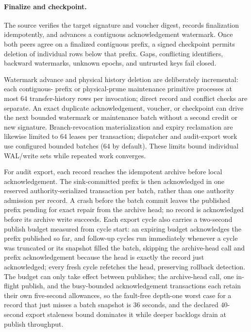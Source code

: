 \documentclass[10pt]{article}
\begin{document}
\paragraph{Finalize and checkpoint.} The source verifies the target signature and voucher digest,
records finalization idempotently, and advances a contiguous acknowledgement watermark. Once both
peers agree on a finalized contiguous prefix, a signed checkpoint permits deletion of individual
rows below that prefix. Gaps, conflicting identifiers, backward watermarks, unknown epochs, and
untrusted keys fail closed.

Watermark advance and physical history deletion are deliberately incremental: each contiguous-
prefix or physical-prune maintenance primitive processes at most 64 transfer-history rows per
invocation; direct record and conflict checks are separate. An exact duplicate acknowledgement,
voucher, or checkpoint can drive the next bounded watermark or maintenance batch without a second
credit or new signature. Branch-revocation materialization and expiry reclamation are likewise
limited to 64 leases per transaction; dispatcher and audit-export work use configured bounded
batches (64 by default). These limits bound individual WAL/write sets while repeated work
converges.

For audit export, each record reaches the idempotent archive before local acknowledgement. The
sink-committed prefix is then acknowledged in one reserved authority-serialized transaction per
batch, rather than one authority admission per record. A crash before the batch commit leaves the
published prefix pending for exact repair from the archive head; no record is acknowledged before
its archive write succeeds. Each export cycle also carries a two-second publish budget measured
from cycle start: an expiring budget acknowledges the prefix published so far, and follow-up
cycles run immediately whenever a cycle was truncated or its snapshot filled the batch, skipping
the archive-head call and prefix acknowledgement because the head is exactly the record just
acknowledged; every fresh cycle refetches the head, preserving rollback detection. The budget
can only take effect between publishes; the archive-head call, one in-flight publish, and the
busy-bounded acknowledgement transactions each retain their own five-second allowances, so the
fault-free depth-one worst case for a record that just misses a batch snapshot is 36 seconds,
and the declared 40-second export staleness bound dominates it while deeper backlogs drain at
publish throughput.
\end{document}
